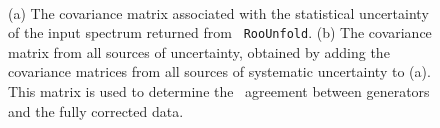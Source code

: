 \begin{figure}
~
~
\caption{(a) The covariance matrix associated with the statistical uncertainty of the input spectrum returned from \texttt{ RooUnfold}. (b) The covariance matrix from all sources of uncertainty, obtained by adding the covariance matrices from all sources of systematic uncertainty to (a). This matrix is used to determine the \chisq\ agreement between generators and the fully corrected data.}
\label{fig:cov}
\end{figure}



